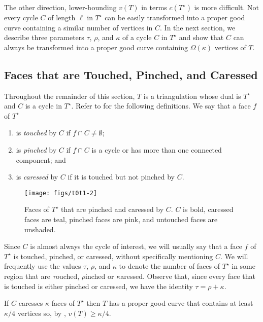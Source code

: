\documentclass{patmorin}
\newcommand{\dual}[1]{{#1}^\star}
\begin{document}
The other direction, lower-bounding $v(T)$ in terms $c(\dual{T})$
is more difficult. Not every cycle $C$ of length $\ell$ in $\dual{T}$
can be easily transformed into a proper good curve containing a similar
number of vertices in $C$.  In the next section, we describe three
parameters $\tau$, $\rho$, and $\kappa$ of a cycle $C$ in $\dual{T}$
and show that $C$ can always be transformed into a proper good curve
containing $\Omega(\kappa)$ vertices of $T$.

\subsection{Faces that are Touched, Pinched, and Caressed}

Throughout the remainder of this section, $T$ is a triangulation
whose dual is $\dual{T}$ and $C$ is a cycle in $\dual{T}$.
Refer to  for the following definitions.
We say that a face $f$ of $\dual{T}$
\begin{enumerate}
  \item is \emph{touched} by $C$ if $f\cap C\neq \emptyset$;
  \item is \emph{pinched} by $C$ if $f\cap C$ is a cycle or has more than 
    one connected component; and
  \item is \emph{caressed} by $C$ if it is touched but not pinched by $C$.
\end{enumerate}

\begin{figure}
  \begin{center}
    \texttt{[image: figs/t0t1-2]}
  \end{center}
  \caption{Faces of $\dual{T}$ that are pinched and caressed by $C$. $C$
  is bold, caressed faces are teal, pinched faces are pink, and untouched
  faces are unshaded.} 
\end{figure}


Since $C$ is almost always the cycle of interest, we will usually say
that a face $f$ of $\dual{T}$ is touched, pinched, or caressed, without
specifically mentioning $C$.  We will frequently use the values $\tau$,
$\rho$, and $\kappa$ to denote the number of faces of $\dual{T}$ in
some region that are $\tau$ouched, $\rho$inched or $\kappa$aressed.
Observe that, since every face that is touched is either pinched or
caressed, we have the identity $\tau = \rho + \kappa$.

\begin{lem}
   If $C$ caresses $\kappa$ faces of $\dual{T}$ then $T$ has a proper
   good curve that contains at least $\kappa/4$ vertices so, by
   , $v(T)\ge \kappa/4$.
\end{lem}
\end{document}
